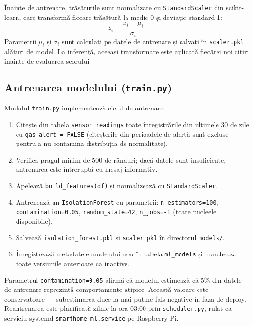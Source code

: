 Înainte de antrenare, trăsăturile sunt normalizate cu \texttt{StandardScaler} din
scikit-learn, care transformă fiecare trăsătură la medie 0 și deviație standard 1:
\begin{equation}
  z_i = \frac{x_i - \mu_i}{\sigma_i}.
  \label{eq:standardscaler}
\end{equation}
Parametrii $\mu_i$ și $\sigma_i$ sunt calculați pe datele de antrenare și salvați în
\texttt{scaler.pkl} alături de model. La inferență, aceeași transformare este aplicată
fiecărei noi citiri înainte de evaluarea scorului.

\subsection{Antrenarea modelului (\texttt{train.py})}

Modulul \texttt{train.py} implementează ciclul de antrenare:

\begin{enumerate}
  \item Citește din tabela \texttt{sensor\_readings} toate înregistrările din
    ultimele 30 de zile cu \texttt{gas\_alert = FALSE} (citeșterile din perioadele
    de alertă sunt excluse pentru a nu contamina distribuția de normalitate).
  \item Verifică pragul minim de 500 de rânduri; dacă datele sunt insuficiente,
    antrenarea este întreruptă cu mesaj informativ.
  \item Apelează \texttt{build\_features(df)} și normalizează cu \texttt{StandardScaler}.
  \item Antrenează un \texttt{IsolationForest} cu parametrii:
    \texttt{n\_estimators=100}, \texttt{contamination=0.05}, \texttt{random\_state=42},
    \texttt{n\_jobs=-1} (toate nucleele disponibile).
  \item Salvează \texttt{isolation\_forest.pkl} și \texttt{scaler.pkl} în directorul
    \texttt{models/}.
  \item Înregistrează metadatele modelului nou în tabela \texttt{ml\_models} și
    marchează toate versiunile anterioare ca inactive.
\end{enumerate}

Parametrul \texttt{contamination=0.05} afirmă că modelul estimează că 5\% din datele
de antrenare reprezintă comportamente atipice. Această valoare este conservatoare —
subestimarea duce la mai puține fals-negative în faza de deploy. Reantrenarea este
planificată zilnic la ora 03:00 prin \texttt{scheduler.py}, rulat ca serviciu systemd
\texttt{smarthome-ml.service} pe Raspberry Pi.

